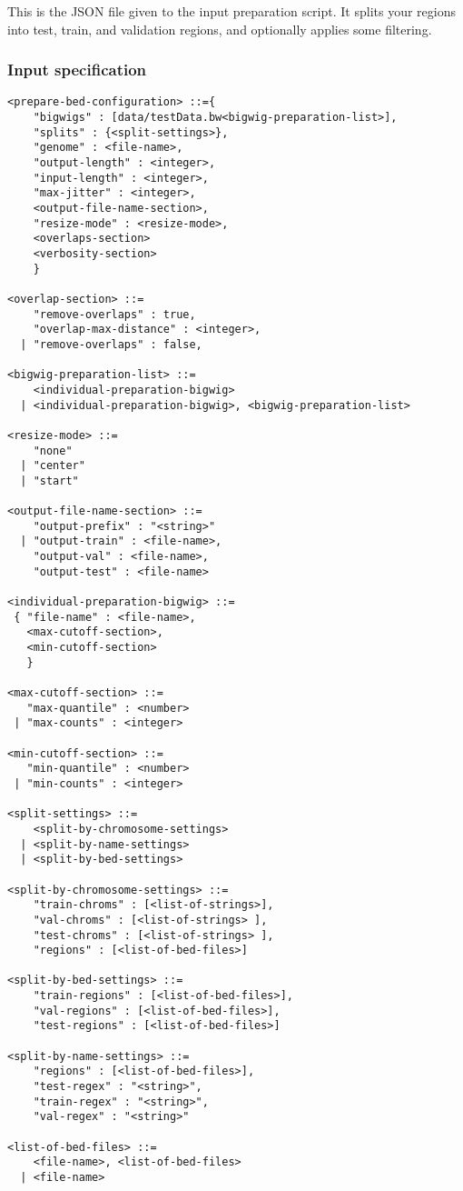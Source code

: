 \documentclass{article}
\begin{document}
This is the JSON file given to the input preparation script. It splits your regions into 
test, train, and validation regions, and optionally applies some filtering. 

\subsubsection{Input specification}

\begin{lstlisting}
<prepare-bed-configuration> ::={
    "bigwigs" : [data/testData.bw<bigwig-preparation-list>],
    "splits" : {<split-settings>},
    "genome" : <file-name>,
    "output-length" : <integer>,
    "input-length" : <integer>,
    "max-jitter" : <integer>,
    <output-file-name-section>,
    "resize-mode" : <resize-mode>,
    <overlaps-section>
    <verbosity-section>
    }

<overlap-section> ::=
    "remove-overlaps" : true,
    "overlap-max-distance" : <integer>,
  | "remove-overlaps" : false,

<bigwig-preparation-list> ::=
    <individual-preparation-bigwig> 
  | <individual-preparation-bigwig>, <bigwig-preparation-list>

<resize-mode> ::= 
    "none"
  | "center"
  | "start"

<output-file-name-section> ::=
    "output-prefix" : "<string>"
  | "output-train" : <file-name>,
    "output-val" : <file-name>,
    "output-test" : <file-name>

<individual-preparation-bigwig> ::=
 { "file-name" : <file-name>,
   <max-cutoff-section>,
   <min-cutoff-section> 
   }

<max-cutoff-section> ::=
   "max-quantile" : <number>
 | "max-counts" : <integer>

<min-cutoff-section> ::=
   "min-quantile" : <number>
 | "min-counts" : <integer>

<split-settings> ::=
    <split-by-chromosome-settings>
  | <split-by-name-settings>
  | <split-by-bed-settings>

<split-by-chromosome-settings> ::=
    "train-chroms" : [<list-of-strings>],
    "val-chroms" : [<list-of-strings> ],
    "test-chroms" : [<list-of-strings> ],
    "regions" : [<list-of-bed-files>]

<split-by-bed-settings> ::=
    "train-regions" : [<list-of-bed-files>],
    "val-regions" : [<list-of-bed-files>],
    "test-regions" : [<list-of-bed-files>]

<split-by-name-settings> ::=
    "regions" : [<list-of-bed-files>],
    "test-regex" : "<string>",
    "train-regex" : "<string>",
    "val-regex" : "<string>"

<list-of-bed-files> ::=
    <file-name>, <list-of-bed-files>
  | <file-name>

\end{lstlisting}
\end{document}
